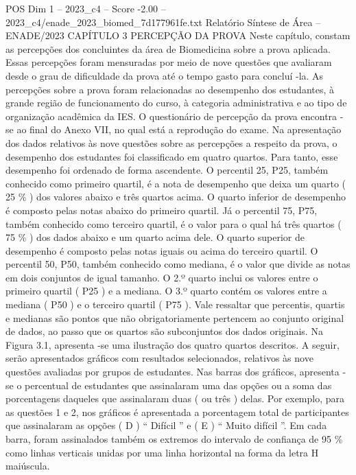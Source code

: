 \begin{textsample}{POS Dim 1 – 2023\_c4 – Score -2.00 – 2023\_c4/enade\_2023\_biomed\_7d177961fe.txt}  \label{ex:f1_pos_195}
Relatório Síntese de Área – ENADE/2023 CAPÍTULO 3 PERCEPÇÃO DA PROVA Neste capítulo, constam as percepções dos concluintes da área de Biomedicina sobre a prova aplicada.
Essas percepções foram mensuradas por meio de nove questões que avaliaram desde o grau de dificuldade da prova até o tempo gasto para concluí -la.
As percepções sobre a prova foram relacionadas ao desempenho dos estudantes, à grande região de funcionamento do curso, à categoria administrativa e ao tipo de organização acadêmica da IES.
O questionário de percepção da prova encontra -se ao final do Anexo VII, no qual está a reprodução do exame.
Na apresentação dos dados relativos às nove questões sobre as percepções a respeito da prova, o desempenho dos estudantes foi classificado em quatro quartos.
Para tanto, esse desempenho foi ordenado de forma ascendente.
O percentil 25, P25, também conhecido como primeiro quartil, é a nota de desempenho que deixa um quarto ( 25 \% ) dos valores abaixo e três quartos acima.
O quarto inferior de desempenho é composto pelas notas abaixo do primeiro quartil.
Já o percentil 75, P75, também conhecido como terceiro quartil, é o valor para o qual há três quartos ( 75 \% ) dos dados abaixo e um quarto acima dele.
O quarto superior de desempenho é composto pelas notas iguais ou acima do terceiro quartil.
O percentil 50, P50, também conhecido como mediana, é o valor que divide as notas em dois conjuntos de igual tamanho.
O 2.º quarto inclui os valores entre o primeiro quartil ( P25 ) e a mediana.
O 3.º quarto contém os valores entre a mediana ( P50 ) e o terceiro quartil ( P75 ).
Vale ressaltar que percentis, quartis e medianas são pontos que não obrigatoriamente pertencem ao conjunto original de dados, ao passo que os quartos são subconjuntos dos dados originais.
Na Figura 3.1, apresenta -se uma ilustração dos quatro quartos descritos.
A seguir, serão apresentados gráficos com resultados selecionados, relativos às nove questões avaliadas por grupos de estudantes.
Nas barras dos gráficos, apresenta -se o percentual de estudantes que assinalaram uma das opções ou a soma das porcentagens daqueles que assinalaram duas ( ou três ) delas.
Por exemplo, para as questões 1 e 2, nos gráficos é apresentada a porcentagem total de participantes que assinalaram as opções ( D ) “ Difícil ” e ( E ) “ Muito difícil ”.
Em cada barra, foram assinalados também os extremos do intervalo de confiança de 95 \% como linhas verticais unidas por uma linha horizontal na forma da letra H maiúscula.

\end{textsample}
